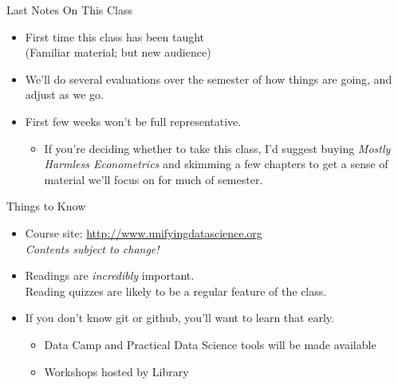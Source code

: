 \documentclass[11pt]{beamer}
\begin{document}
\begin{frame}[c]{Last Notes On This Class}
\begin{itemize}
  \pause \item First time this class has been taught \\
  (Familiar material; but new audience)
  \pause \item We'll do several evaluations over the semester of how things are going, and adjust as we go.
  \pause \item First few weeks won't be full representative.
  \begin{itemize}
    \pause \item If you're deciding whether to take this class, I'd suggest buying \emph{Mostly Harmless Econometrics} and skimming a few chapters to get a sense of material we'll focus on for much of semester.
  \end{itemize}
\end{itemize}
\end{frame}

\begin{frame}[c]{Things to Know}

\begin{itemize}
  \item Course site: \url{http://www.unifyingdatascience.org} \\
  \emph{Contents subject to change!}
  \pause \item Readings are \emph{incredibly} important. \\
  \pause Reading quizzes are likely to be a regular feature of the class.
  \pause \item If you don't know git or github, you'll want to learn that early.
  \begin{itemize}
    \item Data Camp and Practical Data Science tools will be made available
    \item Workshops hosted by Library
  \end{itemize}
\end{itemize}
\end{frame}
\end{document}
